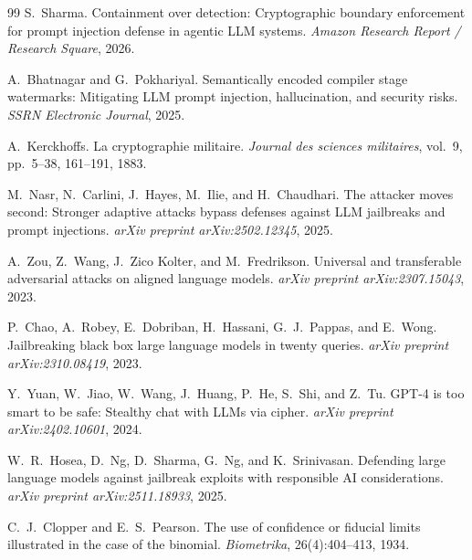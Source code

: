 \begin{thebibliography}{99}
S.~Sharma.
\newblock Containment over detection: Cryptographic boundary enforcement for prompt injection defense in agentic LLM systems.
\newblock \emph{Amazon Research Report / Research Square}, 2026.

A.~Bhatnagar and G.~Pokhariyal.
\newblock Semantically encoded compiler stage watermarks: Mitigating LLM prompt injection, hallucination, and security risks.
\newblock \emph{SSRN Electronic Journal}, 2025.

A.~Kerckhoffs.
\newblock La cryptographie militaire.
\newblock \emph{Journal des sciences militaires}, vol.~9, pp.~5--38, 161--191, 1883.


M.~Nasr, N.~Carlini, J.~Hayes, M.~Ilie, and H.~Chaudhari.
\newblock The attacker moves second: Stronger adaptive attacks bypass defenses against LLM jailbreaks and prompt injections.
\newblock \emph{arXiv preprint arXiv:2502.12345}, 2025.

A.~Zou, Z.~Wang, J.~Zico Kolter, and M.~Fredrikson.
\newblock Universal and transferable adversarial attacks on aligned language models.
\newblock \emph{arXiv preprint arXiv:2307.15043}, 2023.

P.~Chao, A.~Robey, E.~Dobriban, H.~Hassani, G.~J.~Pappas, and E.~Wong.
\newblock Jailbreaking black box large language models in twenty queries.
\newblock \emph{arXiv preprint arXiv:2310.08419}, 2023.

Y.~Yuan, W.~Jiao, W.~Wang, J.~Huang, P.~He, S.~Shi, and Z.~Tu.
\newblock GPT-4 is too smart to be safe: Stealthy chat with LLMs via cipher.
\newblock \emph{arXiv preprint arXiv:2402.10601}, 2024.

W.~R.~Hosea, D.~Ng, D.~Sharma, G.~Ng, and K.~Srinivasan.
\newblock Defending large language models against jailbreak exploits with responsible AI considerations.
\newblock \emph{arXiv preprint arXiv:2511.18933}, 2025.


C.~J.~Clopper and E.~S.~Pearson.
\newblock The use of confidence or fiducial limits illustrated in the case of the binomial.
\newblock \emph{Biometrika}, 26(4):404--413, 1934.


\end{thebibliography}
